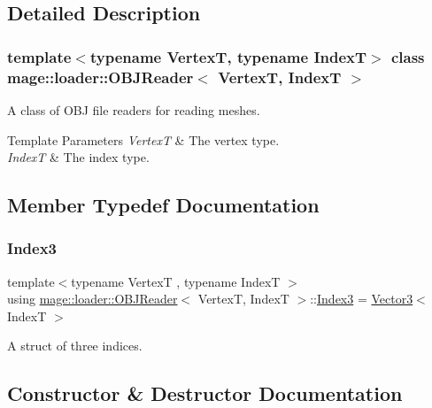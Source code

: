 \subsection{Detailed Description}
\subsubsection*{template$<$typename VertexT, typename IndexT$>$\newline
class mage\+::loader\+::\+O\+B\+J\+Reader$<$ Vertex\+T, Index\+T $>$}

A class of O\+BJ file readers for reading meshes.


\begin{DoxyTemplParams}{Template Parameters}
{\em VertexT} & The vertex type. \\
\hline
{\em IndexT} & The index type. \\
\hline
\end{DoxyTemplParams}


\subsection{Member Typedef Documentation}
\hypertarget{classmage_1_1loader_1_1_o_b_j_reader_af9aab131e88c5a3a0f29b156c4c97096}{}\label{classmage_1_1loader_1_1_o_b_j_reader_af9aab131e88c5a3a0f29b156c4c97096} 
\subsubsection{\texorpdfstring{Index3}{Index3}}
{\footnotesize\ttfamily template$<$typename VertexT , typename IndexT $>$ \\
using \hyperlink{classmage_1_1loader_1_1_o_b_j_reader}{mage\+::loader\+::\+O\+B\+J\+Reader}$<$ VertexT, IndexT $>$\+::\hyperlink{classmage_1_1loader_1_1_o_b_j_reader_af9aab131e88c5a3a0f29b156c4c97096}{Index3} =  \hyperlink{structmage_1_1_vector3}{Vector3}$<$ IndexT $>$\hspace{0.3cm}{\ttfamily [private]}}

A struct of three indices. 

\subsection{Constructor \& Destructor Documentation}
\hypertarget{classmage_1_1loader_1_1_o_b_j_reader_ac0e4964f2898f4eec0212c6c292825c0}{}\label{classmage_1_1loader_1_1_o_b_j_reader_ac0e4964f2898f4eec0212c6c292825c0} 
